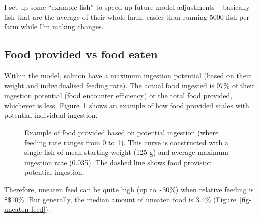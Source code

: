 \documentclass[
  a4paper,
]{article}
\begin{document}
I set up some ``example fish'' to speed up future model adjustments --
basically fish that are the average of their whole farm, easier than
running 5000 fish per farm while I'm making changes.

\subsection{Food provided vs food
eaten}\label{food-provided-vs-food-eaten}

Within the model, salmon have a maximum ingestion potential (based on
their weight and individualised feeding rate). The actual food ingested
is 97\% of their ingestion potential (food encounter efficiency) or the
total food provided, whichever is less.
Figure~\ref{fig-food-prov-theoretical} shows an example of how food
provided scales with potential individual ingestion.

\begin{figure}


\caption{\label{fig-food-prov-theoretical}Example of food provided based
on potential ingestion (where feeding rate ranges from 0 to 1). This
curve is constructed with a single fish of mean starting weight (125 g)
and average maximum ingestion rate (0.035). The dashed line shows food
provision == potential ingestion.}

\end{figure}%

Therefore, uneaten feed can be quite high (up to \textasciitilde30\%)
when relative feeding is \$\leq\$10\%. But generally, the median amount
of uneaten food is 3.4\% (Figure~\ref{fig-uneaten-feed}).
\end{document}

